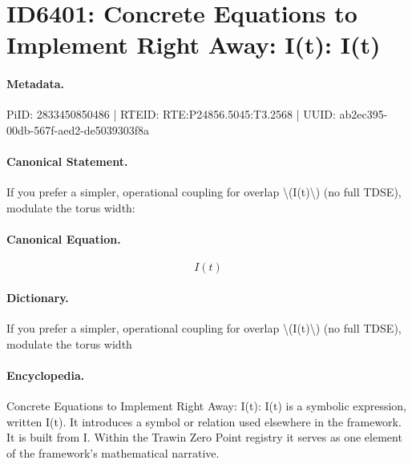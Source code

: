\section*{ID6401: Concrete Equations to Implement Right Away: I(t): I(t)}
\paragraph{Metadata.}
PiID: 2833450850486 | RTEID: RTE:P24856.5045:T3.2568 | UUID: ab2ec395-00db-567f-aed2-de5039303f8a

\paragraph{Canonical Statement.}
If you prefer a simpler, operational coupling for overlap \textbackslash{}(I(t)\textbackslash{}) (no full TDSE), modulate the torus width:

\paragraph{Canonical Equation.}
\[
I(t)
\]

\paragraph{Dictionary.}
If you prefer a simpler, operational coupling for overlap \textbackslash{}(I(t)\textbackslash{}) (no full TDSE), modulate the torus width

\paragraph{Encyclopedia.}
Concrete Equations to Implement Right Away: I(t): I(t) is a symbolic expression, written I(t). It introduces a symbol or relation used elsewhere in the framework. It is built from I. Within the Trawin Zero Point registry it serves as one element of the framework's mathematical narrative.

